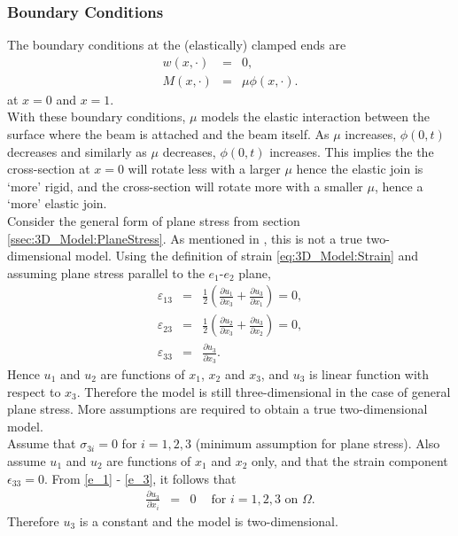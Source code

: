 \documentclass[../../main.tex]{subfiles}
\begin{document}
\subsubsection{Boundary Conditions}
\noindent
The boundary conditions at the (elastically) clamped ends are
\begin{eqnarray}
   w(x,\cdot) &=&  0, \label{CT_5}\\
   M(x,\cdot) &=&  \mu \phi(x,\cdot). \label{CT_6}
\end{eqnarray} at $x = 0$ and $x = 1$.\\

With these boundary conditions, $\mu$ models the elastic interaction between the surface where the beam is attached and the beam itself. As $\mu$ increases, $\phi(0,t)$ decreases and similarly as $\mu$ decreases, $\phi(0,t)$ increases. This implies the the cross-section at $x=0$ will rotate less with a larger $\mu$ hence the elastic join is `more' rigid, and the cross-section will rotate more with a smaller $\mu$, hence a `more' elastic join.\\

Consider the general form of plane stress from section \ref{ssec:3D_Model:PlaneStress}. As mentioned in \cite{Fung65}, this is not a true two-dimensional model. Using the definition of strain \eqref{eq:3D_Model:Strain} and assuming plane stress parallel to the $e_1$-$e_2$ plane,
\begin{eqnarray}
	\varepsilon_{13} &=&  \frac{1}{2}\left( \frac{\partial u_1}{\partial x_3} + \frac{\partial u_3}{\partial x_1} \right) = 0,\label{e_1}\\
	\varepsilon_{23} &=& \frac{1}{2}\left( \frac{\partial u_2}{\partial x_3} + \frac{\partial u_3}{\partial x_2} \right) = 0,\label{e_2}\\
	\varepsilon_{33} &=& \frac{\partial u_3}{\partial x_3}.\label{e_3}
\end{eqnarray}
Hence $u_1$ and $u_2$ are functions of $x_1$, $x_2$ and $x_3$, and $u_3$ is linear function with respect to $x_3$. Therefore the model is still three-dimensional in the case of general plane stress. More assumptions are required to obtain a true two-dimensional model.\\

Assume that $\sigma_{3i} = 0$ for $i = 1,2,3$ (minimum assumption for plane stress). Also assume $u_1$ and $u_2$ are functions of $x_1$ and $x_2$ only, and that the strain component $\epsilon_{33} = 0$. From \eqref{e_1} - \eqref{e_3}, it follows that
\begin{eqnarray*}
	\frac{\partial u_3}{\partial x_i} & = & 0  \ \ \ \ \textrm{ for } i = 1,2,3 \textrm{ on } \Omega.
\end{eqnarray*} 
Therefore $u_3$ is a constant and the model is two-dimensional.
\end{document}
